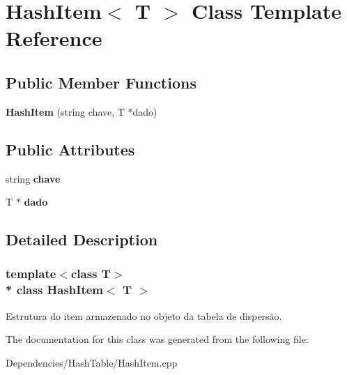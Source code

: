\hypertarget{class_hash_item}{}\section{Hash\+Item$<$ T $>$ Class Template Reference}
\label{class_hash_item}
\subsection*{Public Member Functions}
\begin{DoxyCompactItemize}
\item 
{\bfseries Hash\+Item} (string chave, T $\ast$dado)\hypertarget{class_hash_item_a8a4c4b28ddc78184ecd41b63f434abdf}{}\label{class_hash_item_a8a4c4b28ddc78184ecd41b63f434abdf}

\end{DoxyCompactItemize}
\subsection*{Public Attributes}
\begin{DoxyCompactItemize}
\item 
string {\bfseries chave}\hypertarget{class_hash_item_a1a1f264ea402eca7cd7815c69f1e04f6}{}\label{class_hash_item_a1a1f264ea402eca7cd7815c69f1e04f6}

\item 
T $\ast$ {\bfseries dado}\hypertarget{class_hash_item_a0a392e8f4422db18c49b38ebe5e494e0}{}\label{class_hash_item_a0a392e8f4422db18c49b38ebe5e494e0}

\end{DoxyCompactItemize}


\subsection{Detailed Description}
\subsubsection*{template$<$class T$>$\\*
class Hash\+Item$<$ T $>$}

Estrutura do item armazenado no objeto da tabela de dispersão. 

The documentation for this class was generated from the following file\+:\begin{DoxyCompactItemize}
\item 
Dependencies/\+Hash\+Table/Hash\+Item.\+cpp\end{DoxyCompactItemize}
